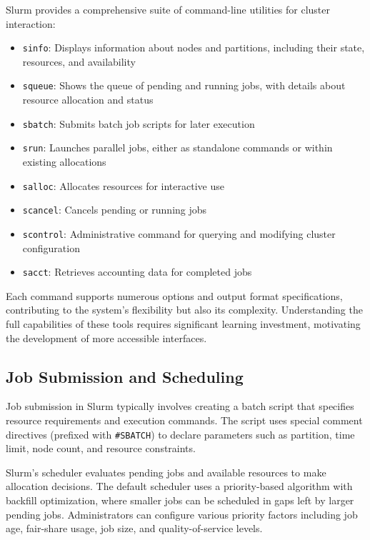 Slurm provides a comprehensive suite of command-line utilities for cluster interaction:

\begin{itemize}
    \item \texttt{sinfo}: Displays information about nodes and partitions, including their state, resources, and availability
    \item \texttt{squeue}: Shows the queue of pending and running jobs, with details about resource allocation and status
    \item \texttt{sbatch}: Submits batch job scripts for later execution
    \item \texttt{srun}: Launches parallel jobs, either as standalone commands or within existing allocations
    \item \texttt{salloc}: Allocates resources for interactive use
    \item \texttt{scancel}: Cancels pending or running jobs
    \item \texttt{scontrol}: Administrative command for querying and modifying cluster configuration
    \item \texttt{sacct}: Retrieves accounting data for completed jobs
\end{itemize}

Each command supports numerous options and output format specifications, contributing to the system's flexibility but also its complexity. Understanding the full capabilities of these tools requires significant learning investment, motivating the development of more accessible interfaces.

\subsection{Job Submission and Scheduling}

Job submission in Slurm typically involves creating a batch script that specifies resource requirements and execution commands. The script uses special comment directives (prefixed with \texttt{\#SBATCH}) to declare parameters such as partition, time limit, node count, and resource constraints.

Slurm's scheduler evaluates pending jobs and available resources to make allocation decisions. The default scheduler uses a priority-based algorithm with backfill optimization, where smaller jobs can be scheduled in gaps left by larger pending jobs. Administrators can configure various priority factors including job age, fair-share usage, job size, and quality-of-service levels.

